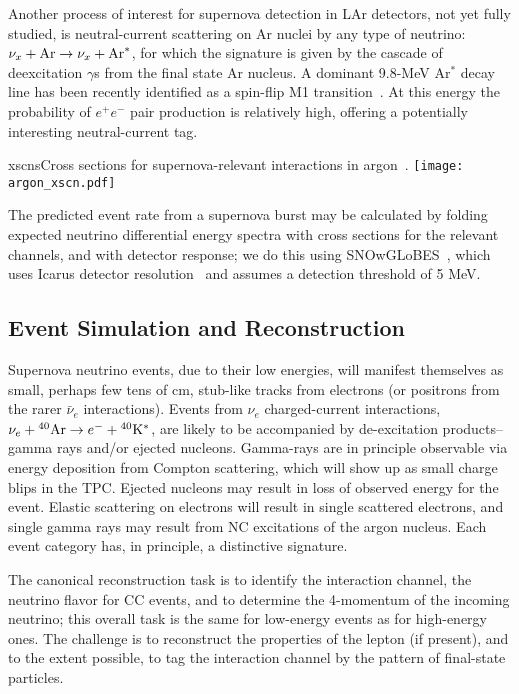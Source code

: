 Another process of interest for supernova detection in LAr detectors, not yet fully studied,  is neutral-current  scattering on Ar nuclei by any type of neutrino: $\nu_x + {\rm Ar} \rightarrow \nu_x + {\rm Ar}^*$,  for which the signature is given by the cascade of deexcitation $\gamma$s from the final state Ar nucleus. A dominant 9.8-MeV Ar$^*$ decay line has been recently identified as a spin-flip M1 transition~\cite{Hayes}.   At this energy the probability of $e^+e^-$ pair production is relatively high, offering a potentially interesting neutral-current tag.


\begin{dunefigure}{xscns}{Cross sections for supernova-relevant interactions in argon~\cite{GilBotella:2003sz,snowglobes}.}
\texttt{[image: argon\_xscn.pdf]}
\end{dunefigure}

The predicted event rate from a supernova burst may be calculated by
folding expected neutrino differential energy spectra with cross
sections for the relevant channels, and with detector response; we do this using SNOwGLoBES~\cite{snowglobes}, which uses Icarus detector resolution~\cite{Amoruso:2003sw} and assumes a detection threshold of 5 MeV.



\subsection{Event Simulation and Reconstruction}

Supernova neutrino events, due to their low energies, will manifest
themselves as small, perhaps few tens of cm, stub-like tracks from
electrons (or positrons from the rarer $\bar{\nu}_e$ interactions).
Events from $\nu_e $ charged-current interactions, $\nu_e+{}^{40}{\rm
  Ar}\rightarrow e^{-}+{}^{40}{\rm K}^{*}$, are likely to be
accompanied by de-excitation products-- gamma rays and/or ejected
nucleons. Gamma-rays are in principle observable via energy deposition
from Compton scattering, which will show up as small charge blips in
the TPC.  
Ejected nucleons may result in loss of observed energy for
the event.  Elastic scattering on electrons will result in single
scattered electrons, and single gamma rays may result from NC
excitations of the argon nucleus.   Each event category has, in principle, a
distinctive signature.

The canonical reconstruction task is to identify the interaction
channel, the neutrino flavor for CC events, and to determine the
4-momentum of the incoming neutrino; this overall task is the same for
low-energy events as for high-energy ones.  The challenge is to
reconstruct the properties of the lepton (if present), and to the extent
possible, to tag the interaction channel by the pattern of final-state
particles.


